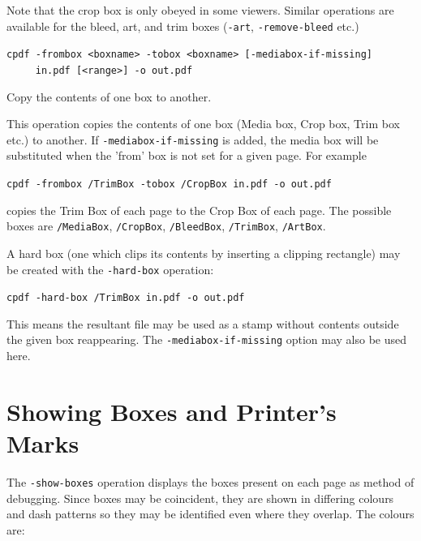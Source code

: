 \documentclass{book}
\begin{document}
\noindent Note that the crop box is only obeyed in some viewers. Similar operations are available for the bleed, art, and trim boxes (\texttt{-art}, \texttt{-remove-bleed} etc.)

  \begin{framed}
  \small\noindent\verb!cpdf -frombox <boxname> -tobox <boxname> [-mediabox-if-missing]! \\
  \noindent\verb!     in.pdf [<range>] -o out.pdf!

  \vspace{2.5mm}
  \noindent Copy the contents of one box to another.

  \end{framed}

  \noindent This operation copies the contents of one box (Media box, Crop box, Trim box etc.) to another. If \texttt{-mediabox-if-missing} is added, the media box will be substituted when the 'from' box is not set for a given page. For example

  \begin{framed}
    \noindent\small\verb!cpdf -frombox /TrimBox -tobox /CropBox in.pdf -o out.pdf!
  \end{framed}

  \noindent copies the Trim Box of each page to the Crop Box of each page. The possible boxes are \texttt{/MediaBox}, \texttt{/CropBox}, \texttt{/BleedBox}, \texttt{/TrimBox}, \texttt{/ArtBox}.\pagestyle{empty}\thispagestyle{fancy}

A hard box (one which clips its contents by inserting a clipping rectangle) may be created with the \texttt{-hard-box} operation:

  \begin{framed}
    \noindent\small\verb!cpdf -hard-box /TrimBox in.pdf -o out.pdf!
  \end{framed}

\noindent This means the resultant file may be used as a stamp without contents outside the given box reappearing. The \texttt{-mediabox-if-missing} option may also be used here.

\section{Showing Boxes and Printer's Marks}

The \texttt{-show-boxes} operation displays the boxes present on each page as method of debugging. Since boxes may be coincident, they are shown in differing colours and dash patterns so they may be identified even where they overlap. The colours are:
\end{document}
